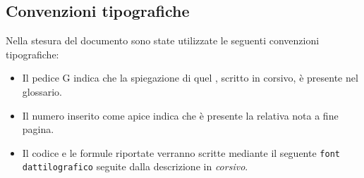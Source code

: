 \subsection{Convenzioni tipografiche}
Nella stesura del documento sono state utilizzate le seguenti convenzioni tipografiche:
\begin{itemize}
    \item Il pedice G indica che la spiegazione di quel , scritto in corsivo, è presente nel glossario.
    \item Il numero inserito come apice indica che è presente la relativa nota a fine pagina.
    \item Il codice e le formule riportate verranno scritte mediante il seguente \texttt{font dattilografico} seguite dalla descrizione in \textit{corsivo}.    
\end{itemize}

\newpage

